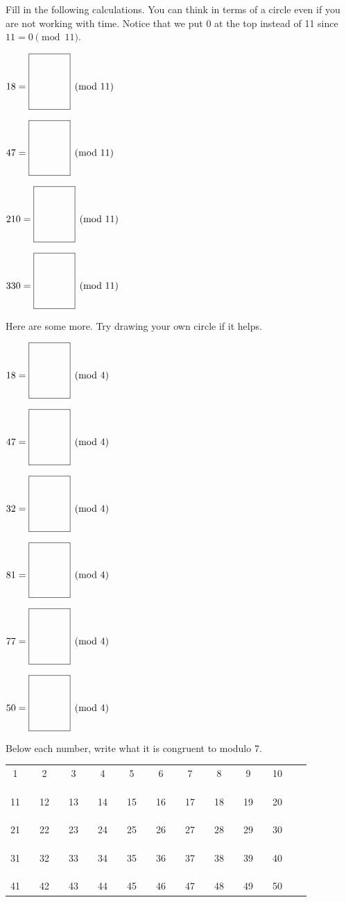 \documentclass[12pt,noauthor,nooutcomes, instructornotes]{ximera}
\begin{document}
\begin{question} Fill in the following calculations. You can think in terms of a circle even if you are not working with time. Notice that we put 0 at the top instead of 11 since $11 = 0 \pmod{11}$.
\begin{center}
\newcommand*{\mynotes}{0,1,2,3,4,5,6,7,8,9,10}
\circlenumb{\mynotes}{}
\end{center}
\begin{enumerate}
\begin{multicols}{2}
    
    \item $18 = \smallanswerbox \pmod{11}$
    \item $47 = \smallanswerbox \pmod{11}$
    \item $210 = \smallanswerbox \pmod{11}$
    \item $330 = \smallanswerbox \pmod{11}$
\end{multicols}

Here are some more. Try drawing your own circle if it helps.

\begin{multicols}{2}
    
    \item $18 = \smallanswerbox \pmod{4}$
    \item $47 = \smallanswerbox \pmod{4}$
    \item $32 = \smallanswerbox \pmod{4}$
    \item $81 = \smallanswerbox \pmod{4}$
    \item $77 = \smallanswerbox \pmod{4}$
    \item $50 = \smallanswerbox \pmod{4}$
\end{multicols}
\end{enumerate}
\end{question}

\begin{question}
Below each number, write what it is congruent to modulo 7.

\begin{tabular}{ccccccccccccccccccccc}
    1 && 2 && 3 && 4 && 5 && 6 && 7 && 8 && 9 && 10 \\
    \\
    \\
    \\
    11 && 12 && 13 && 14 && 15 && 16 && 17 && 18 && 19 && 20 \\
    \\
    \\
    \\
    21 && 22 && 23 && 24 && 25 && 26 && 27 && 28 && 29 && 30 \\
    \\
    \\
    \\
    31 && 32 && 33 && 34 && 35 && 36 && 37 && 38 && 39 && 40 \\
    \\
    \\
    \\
    41 && 42 && 43 && 44 && 45 && 46 && 47 && 48 && 49 && 50
 \\
\end{tabular}
\end{question}
\end{document}
